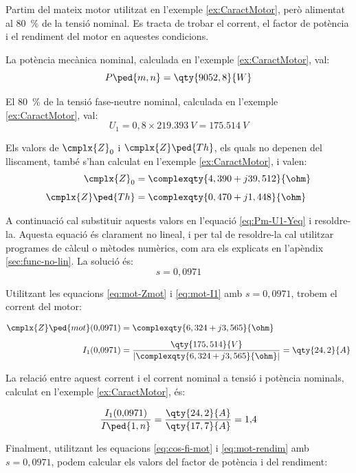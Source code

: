 	
\begin{exemple}\label{ex:MotTensRedSolAp}
	\addcontentsxms{\MotTensRedSolAp}	
	Partim del mateix motor utilitzat en l'exemple \vref{ex:CaractMotor}, però alimentat al \qty{80}{\%} de la tensió nominal. Es tracta de trobar el corrent, el factor de potència i el rendiment del motor en aquestes condicions.
	
	La potència mecànica nominal, calculada  en l'exemple \ref{ex:CaractMotor}, val: \[
	P\ped{m,n} = \qty{9052,8}{W}
	\]
	
	El \qty{80}{\%} de la tensió fase-neutre nominal, calculada  en l'exemple \ref{ex:CaractMotor}, val:
	\[
	U_1 = 0{,}8\times\qty{219,393}{V} = \qty{175,514}{V}
	\]
	
	Els valors de $\cmplx{Z}_0$ i  $\cmplx{Z}\ped{Th}$, els quals no depenen del lliscament, també s'han calculat en  l'exemple \ref{ex:CaractMotor}, i valen:
	\begin{align*}
	\cmplx{Z}_0 &=  \complexqty{4,390+j39,512}{\ohm} \\[1ex]
	\cmplx{Z}\ped{Th} &= \complexqty{0,470+j1,448}{\ohm} 
	\end{align*}
	
	A continuació cal substituir aquests valors en l'equació \eqref{eq:Pm-U1-Yeq} i resoldre-la. Aquesta equació és clarament no lineal, i per tal de resoldre-la cal utilitzar programes de càlcul o mètodes numèrics, com ara els explicats en l'apèndix \ref{sec:func-no-lin}. La solució és:
	\[
	s = 0{,}0971
	\]
	
	Utilitzant les equacions \eqref{eq:mot-Zmot} i \eqref{eq:mot-I1} amb $s  = 0{,}0971$, trobem el corrent del motor:
	
	\begin{align*}
	\cmplx{Z}\ped{mot}(0{,}0971) &=  \complexqty{6,324+j3,565}{\ohm} \\[1ex]
	I_1(0{,}0971) &= \frac{\qty{175,514}{V}}{|\complexqty{6,324+j3,565}{\ohm}|} = \qty{24,2}{A}
	\end{align*}
	
	La relació entre aquest  corrent i el corrent nominal a tensió i potència nominals, calculat en l'exemple \ref{ex:CaractMotor}, és:
	
	\[
	\frac{I_1(0{,}0971)}{I\ped{1,n}} = \frac{\qty{24,2}{A}}{\qty{17,7}{A}} = 1{,}4
	\]
	
	Finalment, utilitzant les equacions  \eqref{eq:cos-fi-mot} i \eqref{eq:mot-rendim} amb $s  = 0{,}0971$, podem calcular els valors del factor de potència i del rendiment:
	

\end{exemple}
